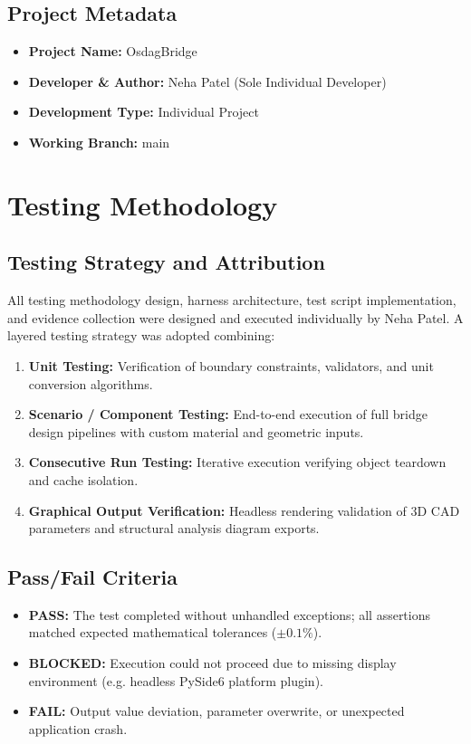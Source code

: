\documentclass[11pt,a4paper]{report}
\begin{document}
\section{Project Metadata}
\begin{itemize}
    \item \textbf{Project Name:} OsdagBridge
    \item \textbf{Developer \& Author:} Neha Patel (Sole Individual Developer)
    \item \textbf{Development Type:} Individual Project
    \item \textbf{Working Branch:} main
\end{itemize}

\chapter{Testing Methodology}
\section{Testing Strategy and Attribution}
All testing methodology design, harness architecture, test script implementation, and evidence collection were designed and executed individually by Neha Patel. A layered testing strategy was adopted combining:
\begin{enumerate}
    \item \textbf{Unit Testing:} Verification of boundary constraints, validators, and unit conversion algorithms.
    \item \textbf{Scenario / Component Testing:} End-to-end execution of full bridge design pipelines with custom material and geometric inputs.
    \item \textbf{Consecutive Run Testing:} Iterative execution verifying object teardown and cache isolation.
    \item \textbf{Graphical Output Verification:} Headless rendering validation of 3D CAD parameters and structural analysis diagram exports.
\end{enumerate}

\section{Pass/Fail Criteria}
\begin{itemize}
    \item \textbf{PASS:} The test completed without unhandled exceptions; all assertions matched expected mathematical tolerances ($\pm 0.1\%$).
    \item \textbf{BLOCKED:} Execution could not proceed due to missing display environment (e.g. headless PySide6 platform plugin).
    \item \textbf{FAIL:} Output value deviation, parameter overwrite, or unexpected application crash.
\end{itemize}
\end{document}
